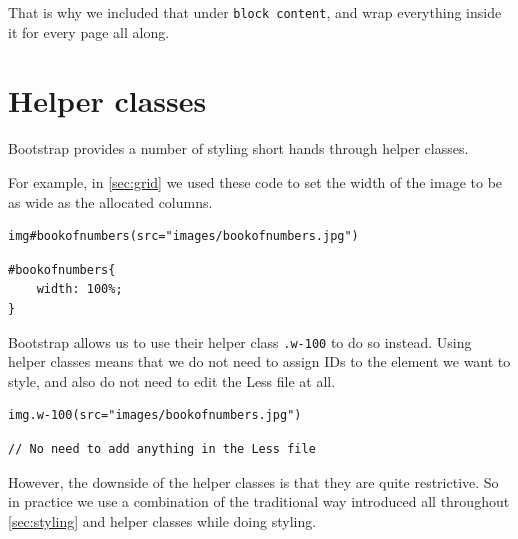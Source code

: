 That is why we included that under \texttt{block content}, and wrap everything inside it for every page all along.

\section{Helper classes}
\label{sec:classshorthands}

Bootstrap provides a number of styling short hands through helper classes.

For example, in \cref{sec:grid} we used these code to set the width of the image to be as wide as the allocated columns.

\begin{lstlisting}[language=pug]
img#bookofnumbers(src="images/bookofnumbers.jpg")
\end{lstlisting}

\begin{lstlisting}[language=pug]
#bookofnumbers{
    width: 100%;
}
\end{lstlisting}

Bootstrap allows us to use their helper class \texttt{.w-100} to do so instead. Using helper classes means that we do not need to assign IDs to the element we want to style, and also do not need to edit the Less file at all. 

\begin{lstlisting}[language=pug]
img.w-100(src="images/bookofnumbers.jpg")
\end{lstlisting}

\begin{lstlisting}[language=pug]
// No need to add anything in the Less file
\end{lstlisting}

However, the downside of the helper classes is that they are quite restrictive. So in practice we use a combination of the traditional way introduced all throughout \cref{sec:styling} and helper classes while doing styling.


